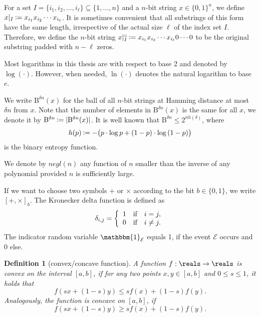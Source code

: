 \documentclass[final,11pt,a4paper]{report}
\newtheorem{definition}[theorem]{Definition}
\newcommand*{\assign}{\ensuremath{\kern.5ex\raisebox{.1ex}{\mbox{\rm:}}\kern -.3em =}}
\renewcommand*{\id}{\mathbbm{1}}   %
\newcommand*{\negl}[1]{\mathit{negl}({#1})}
\newcommand*{\nbit}{\set{0,1}^n}
\newcommand*{\set}[1]{\{#1\}}          %
\newcommand*{\pad}{|^{\circ}}          %
\newcommand*{\ball}[1]{{\mathrm{B}}^{#1}}  %
\newcommand*{\ev}{\ensuremath{\mathcal{E}}\xspace} %
\begin{document}
For a set $I=\{i_1, i_2, \ldots, i_{\ell} \} \subseteq \{1, \ldots,
n\}$ and a $n$-bit string $x \in \nbit$, we define $x|_I \assign
x_{i_1} x_{i_2} \cdots x_{i_{\ell}}$. It is sometimes convenient that
all substrings of this form have the same length, irrespective of the
actual size $\ell$ of the index set $I$. Therefore, we define the
$n$-bit string $x \pad_I \assign x_{i_1} x_{i_2} \cdots
x_{i_{\ell}} 0 \cdots 0$ to be the original substring padded with $n-
\ell$ zeros.

Most logarithms in this thesis are with respect to base 2 and denoted
by $\log(\cdot)$. However, when needed,
$\ln(\cdot)$ denotes the natural logarithm to base
$e$.

We write $\ball{\delta n}(x)$ for the ball of all $n$-bit strings at
Hamming distance at most $\delta n$ from $x$. Note that the number of
elements in $\ball{\delta n}(x)$ is the same for all $x$, we denote it
by $\ball{\delta n} \assign |\ball{\delta n}(x)|$. It is well known
that $\ball{\delta n} \leq 2^{n h(\delta)}$, where
\[h(p)\assign -\big(p\cdot\log{p} + (1-p)\cdot\log{(1-p)}\big)\]
is the binary entropy function.

We denote by \index{negl@$\negl{n}$}$\negl{n}$ any function of $n$
smaller than the inverse of any polynomial provided $n$ is
sufficiently large.

If we want to choose two symbols $+$ or $\times$ according to the bit
$b \in \{0,1\}$, we write $[ +, \times ]_b$. The Kronecker delta function is defined as
\[
\delta_{i,j}= \left\{ \begin{array}{r@{\quad \mbox{if} \quad}l} 1 & i=j, \\ 0 & i
    \neq j. \end{array} \right.
\]
The indicator random variable
$\id_\ev$ equals 1, if the event $\ev$ occurs and $0$ else.

\begin{definition}[convex/concave function] \label{def:convexfunction}
A function $f: \reals \rightarrow \reals$ is \emph{convex} on the
interval $[a,b]$, if for any two points $x,y \in [a,b]$ and
$0 \leq s \leq 1$, it holds that
\[
f(s x + (1-s) y) \leq s f(x) + (1-s) f(y).
\]
Analogously, the function is \emph{concave} on $[a,b]$, if 
\[
f(s x + (1-s) y) \geq s f(x) + (1-s) f(y).
\]
\end{definition}
\end{document}
